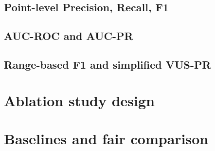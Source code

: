\subsection{Point-level Precision, Recall, F1}
\subsection{AUC-ROC and AUC-PR}
\subsection{Range-based F1 and simplified VUS-PR}

\section{Ablation study design}

\section{Baselines and fair comparison}

